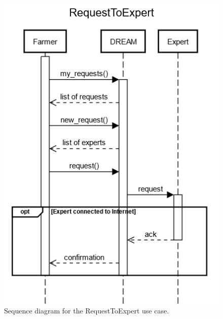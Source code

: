 \documentclass{article}
\begin{document}
\begin{figure}[H]
    \centering
    \includegraphics[scale=0.75]{sequence_diagrams/RequestToExpert.png}
    \caption{Sequence diagram for the RequestToExpert use case.}
\end{figure}
\newpage
\end{document}
